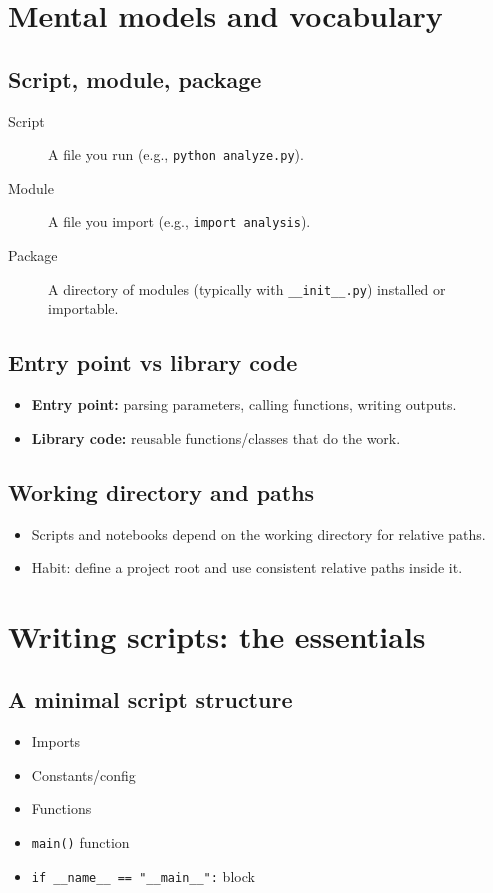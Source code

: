 \section{Mental models and vocabulary}
\subsection{Script, module, package}
\begin{description}
\item[Script] A file you run (e.g., \texttt{python analyze.py}).
\item[Module] A file you import (e.g., \texttt{import analysis}).
\item[Package] A directory of modules (typically with \texttt{\_\_init\_\_.py}) installed or importable.
\end{description}

\subsection{Entry point vs library code}
\begin{itemize}
\item \textbf{Entry point:} parsing parameters, calling functions, writing outputs.
\item \textbf{Library code:} reusable functions/classes that do the work.
\end{itemize}

\subsection{Working directory and paths}
\begin{itemize}
\item Scripts and notebooks depend on the working directory for relative paths.
\item Habit: define a project root and use consistent relative paths inside it.
\end{itemize}

\section{Writing scripts: the essentials}
\subsection{A minimal script structure}
\begin{itemize}
\item Imports
\item Constants/config
\item Functions
\item \texttt{main()} function
\item \texttt{if \_\_name\_\_ == "\_\_main\_\_":} block
\end{itemize}


